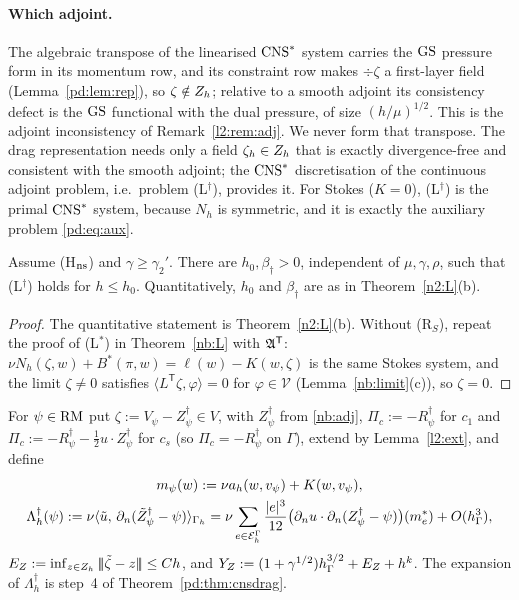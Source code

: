 \paragraph{Which adjoint.} The algebraic transpose of the linearised $\mathrm{CNS}^\ast$ system carries the $\mathrm{GS}$ pressure form in its momentum row, and its constraint row makes $\div\zeta$ a first-layer field (Lemma~\ref{pd:lem:rep}), so $\zeta\notin Z_h$; relative to a smooth adjoint its consistency defect is the $\mathrm{GS}$ functional with the dual pressure, of size $(h/\mu)^{1/2}$. This is the adjoint inconsistency of Remark~\ref{l2:rem:adj}. We never form that transpose. The drag representation needs only a field $\zeta_h\in Z_h$ that is exactly divergence-free and consistent with the smooth adjoint; the $\mathrm{CNS}^\ast$ discretisation of the continuous adjoint problem, i.e.\ problem (L$^\dagger$), provides it. For Stokes ($K=0$), (L$^\dagger$) is the primal $\mathrm{CNS}^\ast$ system, because $N_h$ is symmetric, and it is exactly the auxiliary problem \eqref{pd:eq:aux}.

\begin{theorem}\label{n2:Ldag}
Assume (H$_{\rm ns}$) and $\gamma\ge\gamma_2'$. There are $h_0,\beta_\dagger>0$, independent of $\mu,\gamma,\rho$, such that (L$^\dagger$) holds for $h\le h_0$. Quantitatively, $h_0$ and $\beta_\dagger$ are as in Theorem~\ref{n2:L}(b).
\end{theorem}

\begin{proof}
The quantitative statement is Theorem~\ref{n2:L}(b). Without (R$_S$), repeat the proof of (L$^\ast$) in Theorem~\ref{nb:L} with $\mathfrak A^{\mathsf T}$: $\nu N_h(\zeta,w)+B^\ast(\pi,w)=\ell(w)-K(w,\zeta)$ is the same Stokes system, and the limit $\zeta\ne0$ satisfies $\langle L^{\mathsf T}\zeta,\varphi\rangle=0$ for $\varphi\in\mathcal V$ (Lemma~\ref{nb:limit}(c)), so $\zeta=0$.
\end{proof}

For $\psi\in\mathrm{RM}$ put $\zeta:=V_\psi-Z^\dagger_\psi\in V$, with $Z^\dagger_\psi$ from \eqref{nb:adj}, $\Pi_c:=-R^\dagger_\psi$ for $c_1$ and $\Pi_c:=-R^\dagger_\psi-\frac12u\cdot Z^\dagger_\psi$ for $c_s$ (so $\Pi_c=-R^\dagger_\psi$ on $\Gamma$), extend by Lemma~\ref{l2:ext}, and define
\begin{gather*}
m_\psi(w):=\nu a_h(w,v_\psi)+K(w,v_\psi),\\
\Lambda^\dagger_h(\psi):=\nu\langle \tilde u,\, \partial_n(\tilde Z^\dagger_\psi-\psi)\rangle_{\Gamma_h}=\nu\sum_{e\in\mathcal E_h^\Gamma}\frac{|e|^3}{12}\bigl(\partial_n u\cdot\partial_n(Z^\dagger_\psi-\psi)\bigr)(m_e^\ast)+O(h_\Gamma^3),
\end{gather*}
$E_Z:=\inf_{z\in Z_h}|\!|\!|\tilde\zeta-z|\!|\!|\le Ch$, and $Y_Z:=(1+\gamma^{1/2})h_\Gamma^{3/2}+E_Z+h^k$. The expansion of $\Lambda^\dagger_h$ is step~4 of Theorem~\ref{pd:thm:cnsdrag}.

